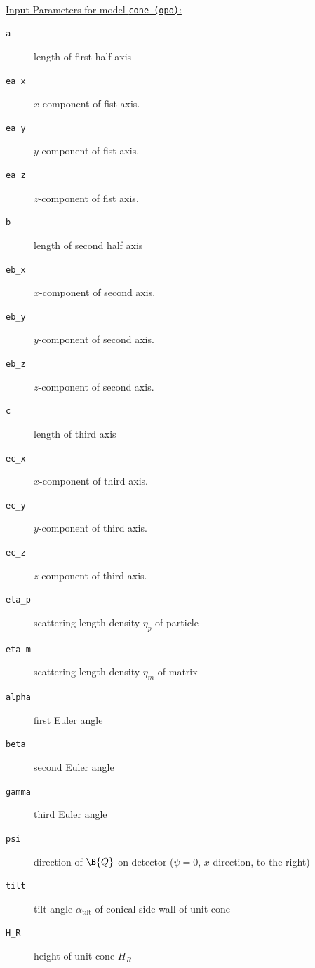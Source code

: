 ~\\
\uline{Input Parameters for model \texttt{cone (opo)}:}
\begin{description}
\item[\texttt{a}] length of first half axis
\item[\texttt{ea\_x}] $x$-component of fist axis.
\item[\texttt{ea\_y}] $y$-component of fist axis.
\item[\texttt{ea\_z}] $z$-component of fist axis.
\item[\texttt{b}] length of second half axis
\item[\texttt{eb\_x}] $x$-component of second axis.
\item[\texttt{eb\_y}] $y$-component of second axis.
\item[\texttt{eb\_z}] $z$-component of second axis.
\item[\texttt{c}] length of third axis
\item[\texttt{ec\_x}] $x$-component of third axis.
\item[\texttt{ec\_y}] $y$-component of third axis.
\item[\texttt{ec\_z}] $z$-component of third axis.
\item[\texttt{eta\_p}] scattering length density $\eta_p$ of particle
\item[\texttt{eta\_m}] scattering length density $\eta_m$ of matrix
\item[\texttt{alpha}] first Euler angle
\item[\texttt{beta}] second Euler angle
\item[\texttt{gamma}] third Euler angle
\item[\texttt{psi}] direction of $\B{Q}$ on detector ($\psi=0$, $x$-direction, to the right)
\item[\texttt{tilt}] tilt angle $\alpha_\mathrm{tilt}$ of conical side wall of unit cone
\item[\texttt{H\_R}] height of unit cone $H_R$
\end{description}

